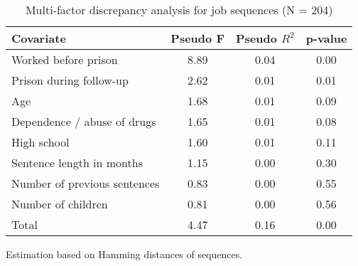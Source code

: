\begin{table}[htp]
\footnotesize
\setlength{\tabcolsep}{10pt}
\renewcommand{\arraystretch}{1.3}
\begin{threeparttable}
\centering
\caption{Multi-factor discrepancy analysis for job sequences (N = 204)} 
\label{tab:discrepancy_job}
\begin{tabular}{lccc}
  \hline
Covariate & Pseudo F & Pseudo $R^2$ & p-value \\ 
  \hline
Worked before prison & 8.89 & 0.04 & 0.00 \\ 
  Prison during follow-up & 2.62 & 0.01 & 0.01 \\ 
  Age & 1.68 & 0.01 & 0.09 \\ 
  Dependence / abuse of drugs & 1.65 & 0.01 & 0.08 \\ 
  High school & 1.60 & 0.01 & 0.11 \\ 
  Sentence length in months & 1.15 & 0.00 & 0.30 \\ 
  Number of previous sentences & 0.83 & 0.00 & 0.55 \\ 
  Number of children & 0.81 & 0.00 & 0.56 \\ 
  Total & 4.47 & 0.16 & 0.00 \\ 
   \hline
\end{tabular}
\begin{tablenotes}
\scriptsize
\item Estimation based on Hamming distances of sequences.
\end{tablenotes}
\end{threeparttable}
\end{table}
